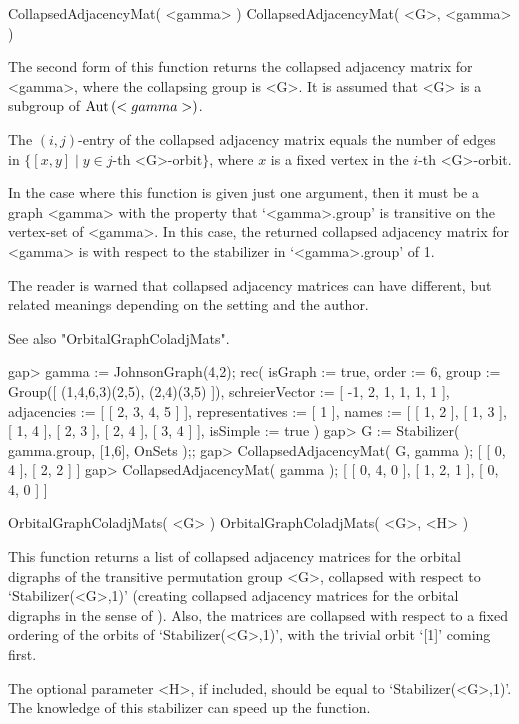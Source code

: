 
\>CollapsedAdjacencyMat( <gamma> )
\>CollapsedAdjacencyMat( <G>, <gamma> )

The second form of this function returns  the  collapsed adjacency
matrix for <gamma>, where the  collapsing group  is <G>.  It is
assumed that <G> is a subgroup of ${\rm Aut}\,(<gamma>)$.

The $(i,j)$-entry of the collapsed adjacency matrix  equals the number of
edges in   $\{ [x,y]\mid  y \in j$-th <G>-orbit$\}$, where  $x$ is  a fixed
vertex in the $i$-th <G>-orbit.

In the case where this function is given just one argument, then it must
be a graph <gamma> with the property that `<gamma>.group' is transitive on
the vertex-set of <gamma>.  In this case, the returned collapsed adjacency
matrix for <gamma> is with respect to the stabilizer in `<gamma>.group'
of 1.

The reader is warned that collapsed adjacency matrices can have different,
but related meanings depending on the setting and the author.

See also "OrbitalGraphColadjMats".

\beginexample
gap> gamma := JohnsonGraph(4,2);
rec( isGraph := true, order := 6,
  group := Group([ (1,4,6,3)(2,5), (2,4)(3,5) ]),
  schreierVector := [ -1, 2, 1, 1, 1, 1 ], adjacencies := [ [ 2, 3, 4, 5 ] ],
  representatives := [ 1 ],
  names := [ [ 1, 2 ], [ 1, 3 ], [ 1, 4 ], [ 2, 3 ], [ 2, 4 ], [ 3, 4 ] ],
  isSimple := true )
gap> G := Stabilizer( gamma.group, [1,6], OnSets );;
gap> CollapsedAdjacencyMat( G, gamma );
[ [ 0, 4 ], [ 2, 2 ] ]
gap> CollapsedAdjacencyMat( gamma );
[ [ 0, 4, 0 ], [ 1, 2, 1 ], [ 0, 4, 0 ] ]
\endexample


\>OrbitalGraphColadjMats( <G> )
\>OrbitalGraphColadjMats( <G>, <H> )

This function returns a list of collapsed adjacency matrices for the
orbital digraphs of the transitive permutation group <G>, collapsed
with respect to `Stabilizer(<G>,1)' (creating collapsed adjacency
matrices for the orbital digraphs in the sense of \cite{PS97}). Also,
the matrices are collapsed with respect to a fixed ordering of the
orbits of `Stabilizer(<G>,1)', with the trivial orbit `[1]' coming
first.

The optional parameter <H>, if included, should be equal to
`Stabilizer(<G>,1)'. The knowledge of this stabilizer can speed up the
function.

